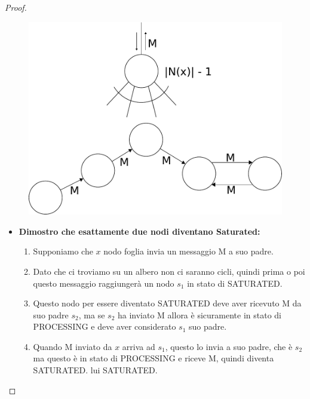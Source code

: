 \begin{proof}
    \ \\
    \begin{figure}[H]
        \centering
        \includegraphics[scale=0.5]{capitoli/saturazione/imgs/n_40}
    \end{figure}

    \begin{itemize}
        \item \textbf{Dimostro che esattamente due nodi diventano Saturated:}
              \begin{enumerate}
                  \item Supponiamo che $x$ nodo foglia invia un messaggio M a suo
                        padre.
                  \item Dato che ci troviamo su un albero non ci saranno cicli, quindi
                        prima o poi questo messaggio raggiungerà un nodo $s_1$ in stato di
                        SATURATED.
                  \item

                        Questo nodo per essere diventato SATURATED deve aver ricevuto
                        M da suo padre $s_2$, ma se $s_2$ ha inviato M allora è
                        sicuramente in stato di PROCESSING e deve aver considerato
                        $s_1$ suo padre.
                  \item Quando M inviato da $x$ arriva ad $s_1$, questo lo invia a suo
                        padre, che è $s_2$ ma questo è in stato di PROCESSING e riceve M,
                        quindi diventa SATURATED.%
                        lui SATURATED.
              \end{enumerate}



\end{itemize}
\end{proof}
